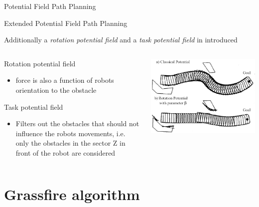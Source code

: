 \documentclass[compress]{beamer}
\begin{document}
\begin{frame}{Potential Field Path Planning}

Extended Potential Field Path Planning

Additionally a \emph{rotation potential field} and a \emph{task
potential field} in introduced

    \begin{columns}
        \begin{column}{0.5\linewidth}
Rotation potential field

\begin{itemize}
\item force is also a function of robots orientation to the obstacle
\end{itemize}

Task potential field

\begin{itemize}
\item Filters out the obstacles that should not influence the robots
  movements, i.e. only the obstacles in the sector Z in front of the
  robot are considered
\end{itemize}
            
        \end{column}
        \begin{column}{0.5\linewidth}
            \begin{center}
                \includegraphics[width=0.8\linewidth]{potentialfield}
            \end{center}
        \end{column}
    \end{columns}

\end{frame}

\section{Grassfire algorithm}
\end{document}
